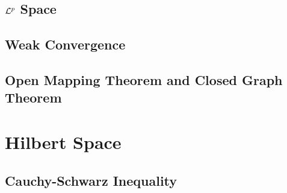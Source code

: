 \documentclass[a4paper, 12pt]{article}
\begin{document}
\subsection{$\mathcal{L}^p$ Space}


\subsection{Weak Convergence}


\subsection{Open Mapping Theorem and Closed Graph Theorem}


\newpage
\section{Hilbert Space}

\subsection{Cauchy-Schwarz Inequality}

\end{document}
